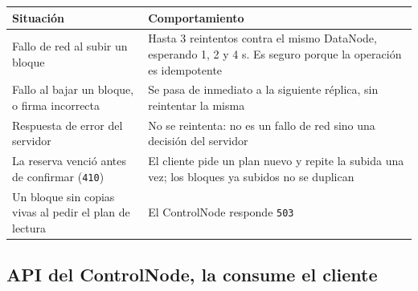 \documentclass[10pt]{article}
\begin{document}
\begin{xltabular}{\linewidth}{@{}L{5.2cm}Y@{}}
\toprule
Situación & Comportamiento \\
\midrule\endhead
Fallo de red al subir un bloque & Hasta 3 reintentos contra el mismo DataNode, esperando 1, 2 y 4 s. Es seguro porque la operación es idempotente  \\
Fallo al bajar un bloque, o firma incorrecta & Se pasa de inmediato a la siguiente réplica, sin reintentar la misma \\
Respuesta de error del servidor & No se reintenta: no es un fallo de red sino una decisión del servidor \\
La reserva venció antes de confirmar (\texttt{410}) & El cliente pide un plan nuevo y repite la subida una vez; los bloques ya subidos no se duplican \\
Un bloque sin copias vivas al pedir el plan de lectura & El ControlNode responde \texttt{503} \\
\bottomrule
\end{xltabular}

\subsection{API del ControlNode, la consume el cliente}
\end{document}
